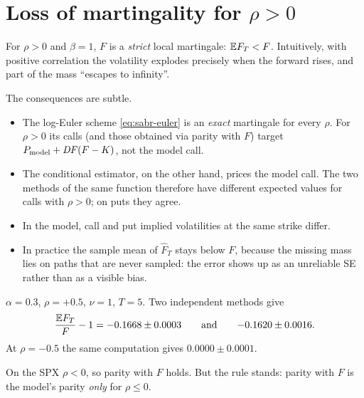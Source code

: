 \section{\texorpdfstring{Loss of martingality for $\rho>0$}{Loss of martingality for ρ>0}}
\label{sec:sabr-rho-pos}
For $\rho>0$ and $\beta=1$, $F$ is a \emph{strict} local martingale: $\mathbb{E} F_T<F$. Intuitively, with positive
correlation the volatility explodes precisely when the forward rises, and part of the mass ``escapes to infinity''.

The consequences are subtle.
\begin{itemize}
\item The log-Euler scheme \eqref{eq:sabr-euler} is an \emph{exact} martingale for every $\rho$. For $\rho>0$ its
calls (and those obtained via parity with $F$) target $P_{\text{model}}+\mathit{DF}(F-K)$, not the model call.
\item The conditional estimator, on the other hand, prices the model call. The two methods of the same function
therefore have different expected values for calls with $\rho>0$; on puts they agree.
\item In the model, call and put implied volatilities at the same strike differ.
\item In practice the sample mean of $\hat F_T$ stays below $F$, because the missing mass lies on paths that are never
sampled: the error shows up as an unreliable SE rather than as a visible bias.
\end{itemize}
\begin{esempio}[title={Example: how large the effect is}]
$\alpha=0.3$, $\rho=+0.5$, $\nu=1$, $T=5$. Two independent methods give
\[
\frac{\mathbb{E} F_T}{F}-1=-0.1668\pm0.0003\qquad\text{and}\qquad{-0.1620}\pm0.0016 .
\]
At $\rho=-0.5$ the same computation gives $0.0000\pm0.0001$.
\end{esempio}

On the SPX $\rho<0$, so parity with $F$ holds. But the rule stands: parity with $F$ is the model's parity \emph{only}
for $\rho\le0$.

